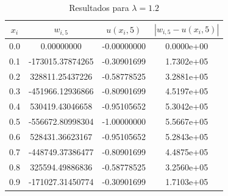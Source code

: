 \documentclass[11pt]{article}
\begin{document}
\begin{table}[H]
    \centering
    \caption{Resultados para \(\lambda = 1.2\)}
    \label{tab:resultados_lambda_1.2}
    \begin{tabular}{cccc}
        \toprule
        \(x_i\) & \(w_{i, 5}\) & \(u(x_i, 5)\) & \(|w_{i, 5} - u(x_i, 5)|\) \\
        \midrule
        0.0 & 0.00000000 & -0.00000000 & 0.0000e+00 \\
        0.1 & -173015.37874265 & -0.30901699 & 1.7302e+05 \\
        0.2 & 328811.25437226 & -0.58778525 & 3.2881e+05 \\
        0.3 & -451966.12936866 & -0.80901699 & 4.5197e+05 \\
        0.4 & 530419.43046658 & -0.95105652 & 5.3042e+05 \\
        0.5 & -556672.80998304 & -1.00000000 & 5.5667e+05 \\
        0.6 & 528431.36623167 & -0.95105652 & 5.2843e+05 \\
        0.7 & -448749.37386477 & -0.80901699 & 4.4875e+05 \\
        0.8 & 325594.49886836 & -0.58778525 & 3.2560e+05 \\
        0.9 & -171027.31450774 & -0.30901699 & 1.7103e+05 \\
        \bottomrule
    \end{tabular}
\end{table}


\printbibliography
\end{document}
